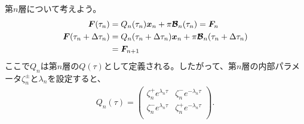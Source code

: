 第$n$層について考えよう。
\begin{align}
\label{eq:Fv1}
    \boldsymbol{F} (\tau_n) &= Q_n(\tau_n) \boldsymbol{x}_n + \pi \boldsymbol{\mathcal{B}}_n (\tau_n) = \boldsymbol{F}_n\\
\label{eq:Fv2}
    \boldsymbol{F} (\tau_n+\Delta \tau_n) &= Q_n(\tau_n + \Delta \tau_n) \boldsymbol{x}_n + \pi \boldsymbol{\mathcal{B}}_n (\tau_n + \Delta \tau_n) \nonumber \\
    &= \boldsymbol{F}_{n+1}
\end{align}
ここで$Q_n$は第$n$層の$Q(\tau)$として定義される。したがって、第$n$層の内部パラメータ$\zeta^\pm_n$と$\lambda_n$を設定すると、
\begin{align}
    Q_n(\tau) = \left(
\begin{array}{cc}
\zeta^+_n e^{\lambda_n \tau} & \zeta^-_n e^{-\lambda_n \tau}  \\
\zeta^-_n e^{\lambda_n \tau} & \zeta^+_n e^{-\lambda_n \tau}  \\
\end{array}
\right).
\end{align}

